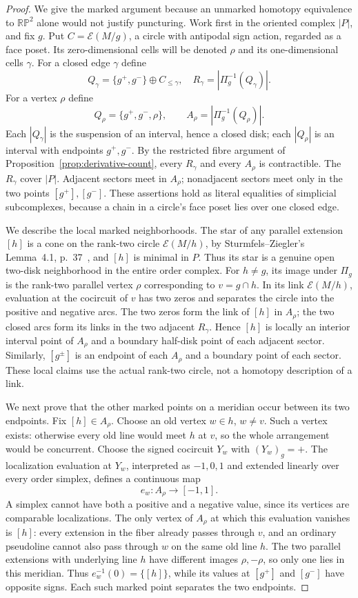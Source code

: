 \begin{proof}

We give the marked argument because an unmarked homotopy equivalence to
$\mathbb {RP}^2$ alone would not justify puncturing.
Work first in the oriented complex $|P|$, and fix $g$. Put
$C=\mathcal E(M/g)$, a circle with antipodal sign action, regarded as a
face poset. Its zero-dimensional cells will be denoted $\rho$ and its
one-dimensional cells $\gamma$. For a closed edge $\gamma$ define
\[
 Q_\gamma=\{g^+,g^-\}\oplus C_{\leq\gamma},\quad
 R_\gamma=|\Pi_g^{-1}(Q_\gamma)|.
\]
For a vertex $\rho$ define
\[
 Q_\rho=\{g^+,g^-,\rho\},\qquad
 A_\rho=|\Pi_g^{-1}(Q_\rho)|.
\]
Each $|Q_\gamma|$ is the suspension of an interval, hence a closed disk;
each $|Q_\rho|$ is an interval with endpoints $g^+,g^-$. By the restricted
fibre argument of Proposition~\ref{prop:derivative-count}, every $R_\gamma$ and every $A_\rho$ is contractible.
The $R_\gamma$ cover $|P|$. Adjacent sectors meet in $A_\rho$; nonadjacent
sectors meet only in the two points $[g^+],[g^-]$. These assertions hold as
literal equalities of simplicial subcomplexes, because a chain in a circle's
face poset lies over one closed edge.

We describe the local marked neighborhoods. The star of any parallel
extension $[h]$ is a cone on the rank-two circle $\mathcal E(M/h)$, by
Sturmfels--Ziegler's Lemma~4.1, p.~37~\cite{SZ1993}, and $[h]$ is minimal in $P$. Thus its star is a genuine open
two-disk neighborhood in the entire order complex. For $h\neq g$, its image
under $\Pi_g$ is the rank-two parallel vertex $\rho$ corresponding to
$v=g\cap h$. In its link $\mathcal E(M/h)$, evaluation at the cocircuit of
$v$ has two zeros and separates the circle into the positive and negative
arcs. The two zeros form the link of $[h]$ in $A_\rho$; the two closed arcs
form its links in the two adjacent $R_\gamma$. Hence $[h]$ is locally an
interior interval point of $A_\rho$ and a boundary half-disk point of each
adjacent sector. Similarly, $[g^\pm]$ is an endpoint of each $A_\rho$ and a
boundary point of each sector. These local claims use the actual rank-two
circle, not a homotopy description of a link.

We next prove that the other marked points on a meridian occur between its
two endpoints. Fix $[h]\in A_\rho$. Choose an old vertex $w\in h$, $w\neq v$.
Such a vertex exists: otherwise every old line would meet $h$ at $v$, so the
whole arrangement would be concurrent. Choose the signed cocircuit $Y_w$
with $(Y_w)_g=+$. The localization evaluation at $Y_w$, interpreted as
$-1,0,1$ and extended linearly over every order simplex, defines a continuous
map
\[
 e_w:A_\rho\longrightarrow[-1,1].
\]
A simplex cannot have both a positive and a negative value, since its
vertices are comparable localizations. The only vertex of $A_\rho$ at
which this evaluation vanishes is $[h]$: every extension in the fiber
already passes through $v$, and an ordinary pseudoline cannot also pass
through $w$ on the same old line $h$. The two parallel extensions with
underlying line $h$ have different images $\rho,-\rho$, so only one lies
in this meridian. Thus $e_w^{-1}(0)=\{[h]\}$, while its values at $[g^+]$
and $[g^-]$ have opposite signs. Each such marked point separates the two
endpoints.


\end{proof}
